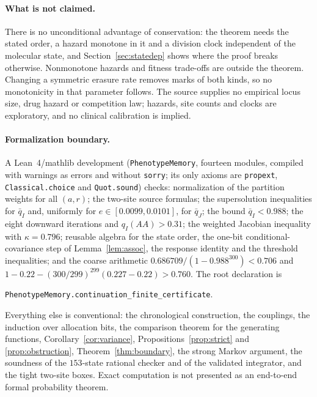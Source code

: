 \documentclass[11pt]{article}
\theoremstyle{remark}
\begin{document}
\paragraph{What is not claimed.} There is no unconditional advantage of
conservation: the theorem needs the stated order, a hazard monotone in it and
a division clock independent of the molecular state, and
Section~\ref{sec:statedep} shows where the proof breaks otherwise. Nonmonotone
hazards and fitness trade-offs are outside the theorem. Changing a symmetric
erasure rate removes marks of both kinds, so no monotonicity in that
parameter follows. The source supplies no empirical locus size, drug hazard
or competition law; hazards, site counts and clocks are exploratory, and no
clinical calibration is implied.

\paragraph{Formalization boundary.} \sloppy A Lean~4/mathlib development
(\texttt{PhenotypeMemory}, fourteen modules, compiled with warnings as errors
and without \texttt{sorry}; its only axioms are \texttt{propext},
\texttt{Classical.choice} and \texttt{Quot.sound}) checks: normalization of
the partition weights for all $(a,r)$; the two-site source formulas; the
supersolution inequalities for $\bar q_I$ and, uniformly for
$e\in[0.0099,0.0101]$, for $\bar q_J$; the bound $\bar q_I<0.988$; the eight
downward iterations and $q_I(AA)>0.31$; the weighted Jacobian inequality with
$\kappa=0.796$; reusable algebra for the state order, the one-bit
conditional-covariance step of Lemma~\ref{lem:assoc}, the response identity
and the threshold inequalities; and the coarse arithmetic
$0.686709/(1-0.988^{300})<0.706$ and
$1-0.22-(300/299)^{299}(0.227-0.22)>0.760$. The root declaration is
\begin{center}\small\texttt{PhenotypeMemory.continuation\_finite\_certificate}.\end{center}
Everything else is conventional: the chronological construction, the
couplings, the induction over allocation bits, the comparison theorem for
the generating functions, Corollary~\ref{cor:variance},
Propositions~\ref{prop:strict} and \ref{prop:obstruction},
Theorem~\ref{thm:boundary}, the strong Markov argument, the soundness of the
$153$-state rational checker and of the validated integrator, and the tight
two-site boxes. Exact computation is not presented as an end-to-end formal
probability theorem.
\end{document}
